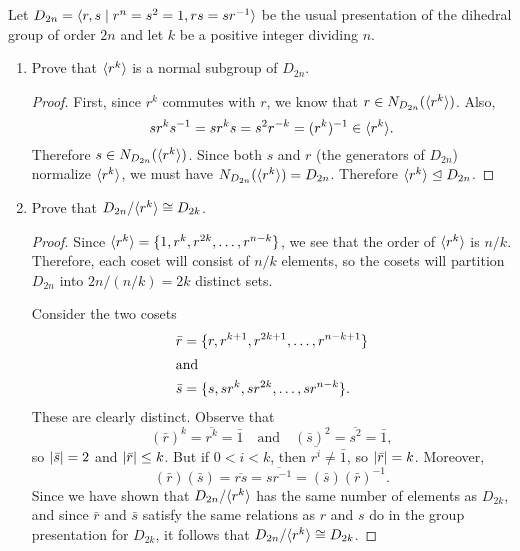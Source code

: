  Let $D_{2n} = \langle{r,s\mid r^n = s^2 = 1, rs = sr^{-1}}\rangle$
be the usual presentation of the dihedral group of order $2n$ and let
$k$ be a positive integer dividing $n$.
\begin{enumerate}
\item Prove that $\langle{r^k}\rangle$ is a normal subgroup of $D_{2n}$.
  \begin{proof}
    First, since $r^k$ commutes with $r$, we know that
    $r\in N_{D_{2n}}(\langle{r^k}\rangle)$. Also,
    \begin{equation*}
      sr^ks^{-1} = sr^ks = s^2r^{-k} = (r^k)^{-1}\in\langle{r^k}\rangle.
    \end{equation*}
    Therefore $s\in N_{D_{2n}}(\langle{r^k}\rangle)$. Since both $s$ and $r$
    (the generators of $D_{2n}$) normalize $\langle{r^k}\rangle$, we must have
    $N_{D_{2n}}(\langle{r^k}\rangle) = D_{2n}$. Therefore
    $\langle{r^k}\rangle\trianglelefteq D_{2n}$.
  \end{proof}

\item Prove that $D_{2n}/\langle{r^k}\rangle\cong D_{2k}$.
  \begin{proof}
    Since $\langle{r^k}\rangle = \{1,r^k,r^{2k},\dots,r^{n-k}\}$, we see that
    the order of $\langle{r^k}\rangle$ is $n/k$. Therefore, each coset will
    consist of $n/k$ elements, so the cosets will partition $D_{2n}$
    into $2n/(n/k) = 2k$ distinct sets.

    Consider the two cosets
    \begin{align*}
      \bar{r} &= \{r, r^{k+1}, r^{2k+1}, \dots, r^{n-k+1}\} \\
      \intertext{and}
      \bar{s} &= \{s, sr^k, sr^{2k}, \dots, sr^{n-k}\}.
    \end{align*}
    These are clearly distinct. Observe that
    \begin{equation*}
      (\bar{r})^k = \overline{r^k} = \bar1
      \quad\text{and}\quad
      (\bar{s})^2 = \overline{s^2} = \bar1,
    \end{equation*}
    so $\lvert{\bar{s}}\rvert = 2$ and $\lvert{\bar{r}}\rvert \leq k$. But if $0<i<k$,
    then $\overline{r^i}\neq\bar1$, so $\lvert{\bar{r}}\rvert = k$. Moreover,
    \begin{equation*}
      (\bar{r})(\bar{s}) = \overline{rs} = \overline{sr^{-1}}
      = (\bar{s})(\bar{r})^{-1}.
    \end{equation*}
    Since we have shown that $D_{2n}/\langle{r^k}\rangle$ has the same number of
    elements as $D_{2k}$, and since $\bar{r}$ and $\bar{s}$ satisfy
    the same relations as $r$ and $s$ do in the group presentation for
    $D_{2k}$, it follows that $D_{2n}/\langle{r^k}\rangle\cong D_{2k}$.
  \end{proof}
\end{enumerate}

